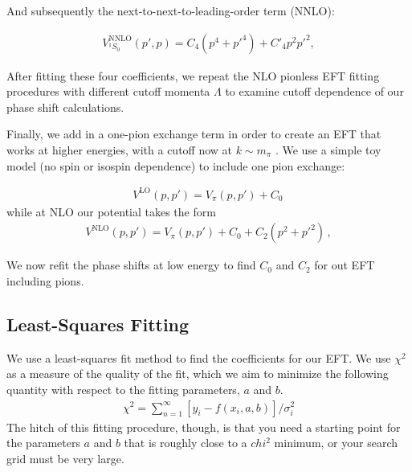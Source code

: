 \documentclass[10pt,showpacs,preprintnumbers,footinbib,amsmath,amssymb,aps,prl,twocolumn,groupedaddress,superscriptaddress,showkeys]{revtex4-1}
\begin{document}
And subsequently the next-to-next-to-leading-order term (NNLO):

\begin{equation}
\begin{split}
V^\mathrm{NNLO}_{^1S_0}(p',p)=C_4(p^4 + p'^4) + C'_4 p^2p'^2,
\end{split}
\end{equation}

After fitting these four coefficients, we repeat the NLO pionless EFT fitting procedures
with different cutoff momenta $\Lambda$ to examine cutoff dependence of our phase
shift calculations.

Finally, we add in a one-pion exchange term in order to create an EFT that works at
higher energies, with a cutoff now at $k\sim m_{\pi}$ . We use a simple toy model
(no spin or isospin dependence) to include one pion exchange: 

\begin{equation}
\begin{split}
V^\mathrm{LO}(p,p')= V_{\pi}(p,p') + C_0\,
\end{split}
\end{equation}
while at NLO our potential takes the form
\begin{equation}
\begin{split}
V^\mathrm{NLO}(p,p')= V_{\pi}(p,p') + C_0 + C_2(p^2+p'^2)\,,
\end{split}
\end{equation}

We now refit the phase shifts at low energy to find $C_0$ and $C_2$ for out EFT including pions.

\subsection{Least-Squares Fitting}

We use a least-squares fit method to find the coefficients for our EFT. We use $\chi^2$ as a
measure of the quality of the fit, which we aim to minimize the following quantity with respect
to the fitting parameters, $a$ and $b$.
\begin{equation}
\begin{split}
	\chi^2=\sum_{n=1}^{\infty} [y_i-f(x_i,a,b)]/\sigma_i^2
\end{split}
\end{equation}
The hitch of this fitting procedure, though, is that you need a starting point for the parameters
$a$ and $b$ that is roughly close to a $chi^2$ minimum, or your search grid must be very large.
\end{document}
